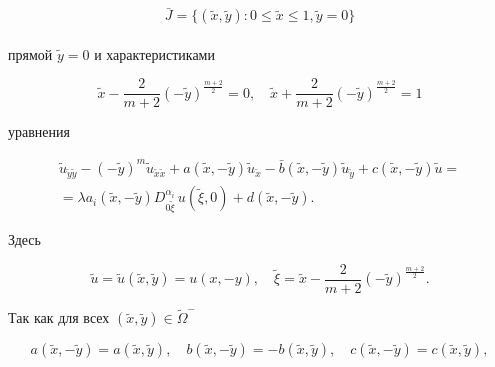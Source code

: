 $$\bar{J}=\{(\widetilde{x},\widetilde{y}): 0\leqslant\widetilde{x}\leqslant 1, \widetilde{y}=0\}$$ \\

прямой $\widetilde{y}=0$ и характеристиками

$$

\widetilde{x}-\frac{2}{m+2} (-\widetilde{y})^{\frac{m+2}{2}}=0, \quad

\widetilde{x}+\frac{2}{m+2} (-\widetilde{y})^{\frac{m+2}{2}}=1

$$

уравнения

\begin{multline}

\label{Attfor2015_32}

\widetilde{u}_{\widetilde{y}\widetilde{y}}-

(-\widetilde{y})^m \widetilde{u}_{\widetilde{x}\widetilde{x}}+

     a (\widetilde{x},-\widetilde{y})\widetilde{u}_{\widetilde{x}}-

\bar{b}(\widetilde{x},-\widetilde{y})\widetilde{u}_{\widetilde{y}}+

     c (\widetilde{x},-\widetilde{y})\widetilde{u}=

\\

=\lambda a_i (\widetilde{x},-\widetilde{y}) 

D_{0\widetilde{\xi}}^{\alpha_i}\, u(\widetilde{\xi} , 0)+

d(\widetilde{x},-\widetilde{y}).

\end{multline}



\noindent

Здесь

$$

\widetilde{u}=\widetilde{u}(\widetilde{x},\widetilde{y})=u(x,-y), \quad 

\widetilde{\xi}=\widetilde{x}-\frac{2}{m+2} (-\widetilde{y})^{\frac{m+2}{2}}.

$$



Так как для всех $(\widetilde{x},\widetilde{y})\in\widetilde{\Omega}^-$

$$a(\widetilde{x},-\widetilde{y})= a(\widetilde{x},\widetilde{y}),\quad  

b(\widetilde{x},-\widetilde{y})=-b(\widetilde{x},\widetilde{y}),\quad  

c(\widetilde{x},-\widetilde{y})= c(\widetilde{x},\widetilde{y}),$$ 

